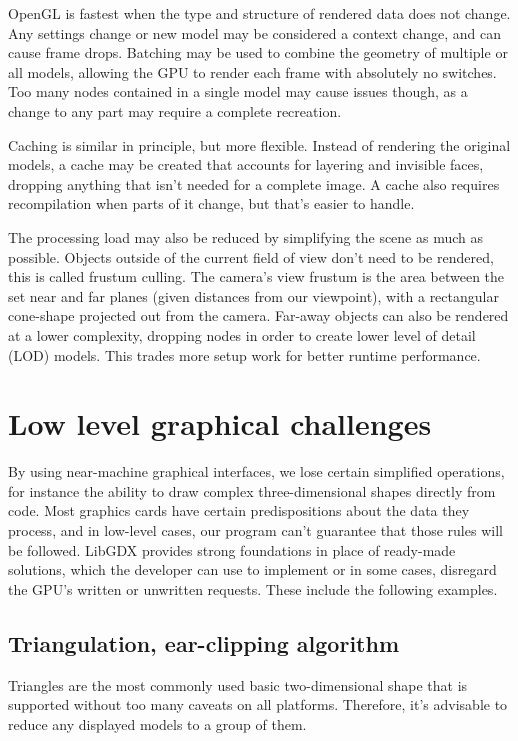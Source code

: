 OpenGL is fastest when the type and structure of rendered data does not change. Any settings change or new model may be considered a context change, and can cause frame drops. Batching may be used to combine the geometry of multiple or all models, allowing the GPU to render each frame with absolutely no switches. Too many nodes contained in a single model may cause issues though, as a change to any part may require a complete recreation.

Caching is similar in principle, but more flexible. Instead of rendering the original models, a cache may be created that accounts for layering and invisible faces, dropping anything that isn't needed for a complete image. A cache also requires recompilation when parts of it change, but that's easier to handle.

The processing load may also be reduced by simplifying the scene as much as possible. Objects outside of the current field of view don't need to be rendered, this is called frustum culling. The camera's view frustum is the area between the set near and far planes (given distances from our viewpoint), with a rectangular cone-shape projected out from the camera. Far-away objects can also be rendered at a lower complexity, dropping nodes in order to create lower level of detail (LOD) models. This trades more setup work for better runtime performance.

\section{Low level graphical challenges}

By using near-machine graphical interfaces, we lose certain simplified operations, for instance the ability to draw complex three-dimensional shapes directly from code. Most graphics cards have certain predispositions about the data they process, and in low-level cases, our program can't guarantee that those rules will be followed. LibGDX provides strong foundations in place of ready-made solutions, which the developer can use to implement or in some cases, disregard the GPU's written or unwritten requests. These include the following examples.

\subsection{Triangulation, ear-clipping algorithm}

Triangles are the most commonly used basic two-dimensional shape that is supported without too many caveats on all platforms. Therefore, it's advisable to reduce any displayed models to a group of them.

